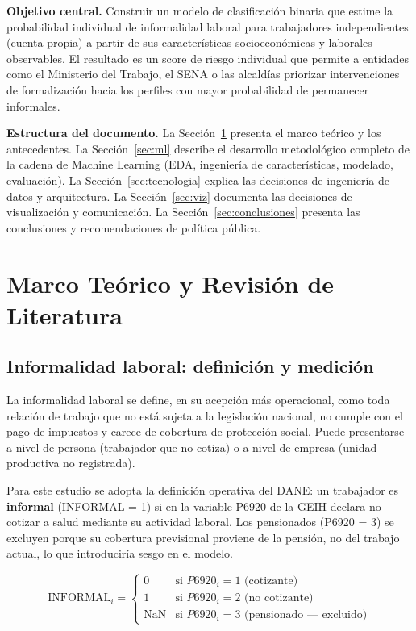 \documentclass[12pt, a4paper]{article}
\begin{document}
\textbf{Objetivo central.} Construir un modelo de clasificación binaria que estime la
probabilidad individual de informalidad laboral para trabajadores independientes
(cuenta propia) a partir de sus características socioeconómicas y laborales observables.
El resultado es un score de riesgo individual que permite a entidades como el Ministerio
del Trabajo, el SENA o las alcaldías priorizar intervenciones de formalización hacia los
perfiles con mayor probabilidad de permanecer informales.

\textbf{Estructura del documento.} La Sección~\ref{sec:marco} presenta el marco teórico y
los antecedentes. La Sección~\ref{sec:ml} describe el desarrollo metodológico completo
de la cadena de Machine Learning (EDA, ingeniería de características, modelado, evaluación).
La Sección~\ref{sec:tecnologia} explica las decisiones de ingeniería de datos y arquitectura.
La Sección~\ref{sec:viz} documenta las decisiones de visualización y comunicación. La
Sección~\ref{sec:conclusiones} presenta las conclusiones y recomendaciones de política pública.

\section{Marco Teórico y Revisión de Literatura}
\label{sec:marco}

\subsection{Informalidad laboral: definición y medición}

La informalidad laboral se define, en su acepción más operacional, como toda relación
de trabajo que no está sujeta a la legislación nacional, no cumple con el pago de
impuestos y carece de cobertura de protección social. Puede presentarse a nivel de persona
(trabajador que no cotiza) o a nivel de empresa (unidad productiva no registrada).

Para este estudio se adopta la definición operativa del DANE: un trabajador es
\textbf{informal} (INFORMAL = 1) si en la variable P6920 de la GEIH declara no cotizar
a salud mediante su actividad laboral. Los pensionados (P6920 = 3) se excluyen porque
su cobertura previsional proviene de la pensión, no del trabajo actual, lo que introduciría
sesgo en el modelo.

\begin{equation}
  \text{INFORMAL}_i =
  \begin{cases}
    0 & \text{si } P6920_i = 1 \text{ (cotizante)}\\
    1 & \text{si } P6920_i = 2 \text{ (no cotizante)}\\
    \text{NaN} & \text{si } P6920_i = 3 \text{ (pensionado — excluido)}
  \end{cases}
\end{equation}
\end{document}
